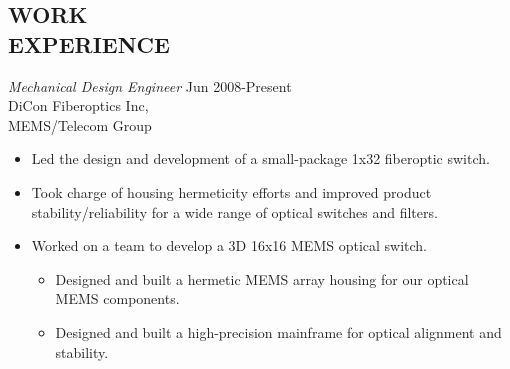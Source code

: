 \documentclass[margin]{res}
\begin{document}
\begin{resume}
\section{WORK \\ EXPERIENCE} {\sl Mechanical Design Engineer} \hfill Jun 2008-Present \\
               DiCon Fiberoptics Inc,\\
               MEMS/Telecom Group 
                 \begin{itemize}  \itemsep -2pt %
                 \item  Led the design and development of a small-package 1x32 fiberoptic switch. 
                \item   Took charge of housing hermeticity efforts and improved product stability/reliability for a wide range of optical switches and filters.
	     \item   Worked on a team to develop a 3D 16x16 MEMS optical switch.
		\begin{itemize} \itemsep -2pt
			\item Designed and built a hermetic MEMS array housing for our optical MEMS components.
			\item Designed and built a high-precision mainframe for optical alignment and stability.
		\end{itemize}
                \end{itemize}


\end{resume}
\end{document}
